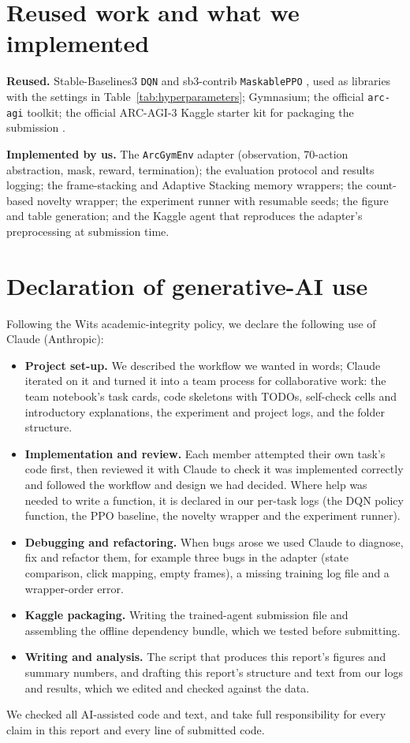 \documentclass[10pt]{article}
\begin{document}
\section{Reused work and what we implemented}
\label{sec:supp-reuse}

\textbf{Reused.} Stable-Baselines3 \texttt{DQN} and sb3-contrib \texttt{MaskablePPO} \citep{raffin2021stable}, used as libraries with the settings in Table~\ref{tab:hyperparameters}; Gymnasium; the official \texttt{arc-agi} toolkit; the official ARC-AGI-3 Kaggle starter kit for packaging the submission \citep{arcstarterkit2026}.

\textbf{Implemented by us.} The \texttt{ArcGymEnv} adapter (observation, 70-action abstraction, mask, reward, termination); the evaluation protocol and results logging; the frame-stacking and Adaptive Stacking memory wrappers; the count-based novelty wrapper; the experiment runner with resumable seeds; the figure and table generation; and the Kaggle agent that reproduces the adapter's preprocessing at submission time.

\section{Declaration of generative-AI use}
\label{sec:supp-ai}

Following the Wits academic-integrity policy, we declare the following use of Claude (Anthropic):
\begin{itemize}
    \item \textbf{Project set-up.} We described the workflow we wanted in words; Claude iterated on it and turned it into a team process for collaborative work: the team notebook's task cards, code skeletons with TODOs, self-check cells and introductory explanations, the experiment and project logs, and the folder structure.
    \item \textbf{Implementation and review.} Each member attempted their own task's code first, then reviewed it with Claude to check it was implemented correctly and followed the workflow and design we had decided. Where help was needed to write a function, it is declared in our per-task logs (the DQN policy function, the PPO baseline, the novelty wrapper and the experiment runner).
    \item \textbf{Debugging and refactoring.} When bugs arose we used Claude to diagnose, fix and refactor them, for example three bugs in the adapter (state comparison, click mapping, empty frames), a missing training log file and a wrapper-order error.
    \item \textbf{Kaggle packaging.} Writing the trained-agent submission file and assembling the offline dependency bundle, which we tested before submitting.
    \item \textbf{Writing and analysis.} The script that produces this report's figures and summary numbers, and drafting this report's structure and text from our logs and results, which we edited and checked against the data.
\end{itemize}
We checked all AI-assisted code and text, and take full responsibility for every claim in this report and every line of submitted code.
\end{document}
